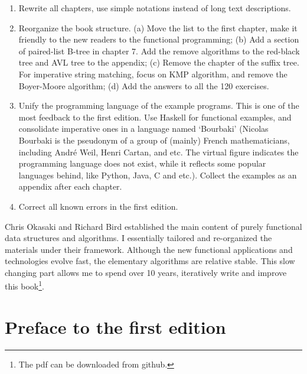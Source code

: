 \documentclass[b5paper]{article}
\begin{document}
\begin{enumerate}
\item Rewrite all chapters, use simple notations instead of long text descriptions.

\item Reorganize the book structure. (a) Move the list to the first chapter, make it friendly to the new readers to the functional programming; (b) Add a section of paired-list B-tree in chapter 7. Add the remove algorithms to the red-black tree and AVL tree to the appendix; (c) Remove the chapter of the suffix tree. For imperative string matching, focus on KMP algorithm, and remove the Boyer-Moore algorithm; (d) Add the answers to all the 120 exercises.

\item Unify the programming language of the example programs. This is one of the most feedback to the first edition. Use Haskell for functional examples, and consolidate imperative ones in a language named `Bourbaki' (Nicolas Bourbaki is the pseudonym of a group of (mainly) French mathematicians, including André Weil, Henri Cartan, and etc. The virtual figure indicates the programming language does not exist, while it reflects some popular languages behind, like Python, Java, C and etc.). Collect the examples as an appendix after each chapter.

\item Correct all known errors in the first edition.
\end{enumerate}

Chris Okasaki and Richard Bird established the main content of purely functional data structures and algorithms. I essentially tailored and re-organized the materials under their framework. Although the new functional applications and technologies evolve fast, the elementary algorithms are relative stable. This slow changing part allows me to spend over 10 years, iteratively write and improve this book\footnote{The pdf can be downloaded from github.}.

\vspace{15mm}



\chapter*{Preface to the first edition}
\end{document}
